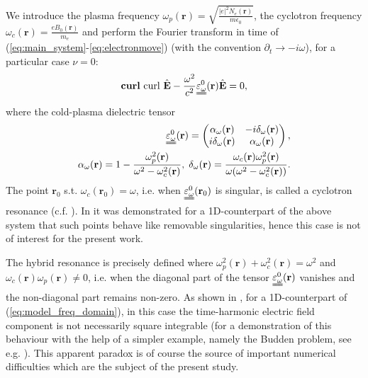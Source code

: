 We introduce the plasma frequency $\omega_p(\mathbf{r})=\sqrt{\frac{|e|^2N_e(\mathbf{r})}{m\epsilon_0}}$, 
the cyclotron frequency $\omega_c(\mathbf{r})=\frac{e B_0(\mathbf{r})}{m_e}$ and perform the Fourier transform 
in time of (\ref{eq:main_system}-\ref{eq:electronmove}) (with the convention $\partial_t\rightarrow -i\omega$), for a 
particular case $\nu=0$:
\begin{align}
\label{eq:model_freq_domain}
 \mathbf{curl}\  {\operatorname{curl}}\  \hat{\mathbf{E}}-\frac{\omega^2}{c^2}\uuline{\varepsilon_{\omega}^{0}}(\mathbf{r})\hat{\mathbf{E}}=0,
\end{align}
where the cold-plasma dielectric tensor \cite[Chapter 1-2]{Stix}
\begin{align}
\nonumber
\uuline{\varepsilon_{\omega}^{0}}(\mathbf{r})=\left(
 \begin{matrix}
  \alpha_{\omega}(\mathbf{r})& -i\delta_{\omega}(\mathbf{r})\\
  i\delta_{\omega}(\mathbf{r}) & \alpha_{\omega}(\mathbf{r})
 \end{matrix}
\right),\\
\label{eq:alpha_delta}
\alpha_{\omega}(\mathbf{r})=1-\frac{\omega_p^2(\mathbf{r})}{\omega^2-\omega_c^2(\mathbf{r})},\; \delta_{\omega}(\mathbf{r})=\frac{\omega_c(\mathbf{r})\omega_p^2(\mathbf{r})}{\omega(\omega^2-\omega_c^2(\mathbf{r}))}.
\end{align}
The point $\mathbf{r}_0$ s.t. $\omega_c(\mathbf{r}_0)=\omega$, i.e. when $\uuline{\varepsilon_{\omega}^{0}}(\mathbf{r}_0)$ is singular, is called a cyclotron resonance (c.f. \cite[Chapter 1-5]{Stix}). 
In \cite{singular_solutions} it was demonstrated for a 1D-counterpart of the above system that such points behave like removable singularities, 
hence this case is not of interest for the present work. 

 The hybrid resonance is precisely defined 
 where  $\omega_p^2(\mathbf{r})+\omega_c^2(\mathbf{r})=\omega^2$ and $\omega_c(\mathbf{r})\omega_p(\mathbf{r})\neq 0$, i.e. when the diagonal part of the tensor 
$\uuline{\varepsilon_{\omega}^{0}}(\mathbf{r})$ vanishes and the non-diagonal part remains non-zero.
As shown in \cite{Despres_2014, singular_solutions}, for a 1D-counterpart of (\ref{eq:model_freq_domain}), in this case the time-harmonic electric field component  is not necessarily square 
integrable (for a demonstration of this behaviour with the help of a simpler example, namely the Budden problem, see e.g. \cite{Despres_2014}). 
This apparent paradox is of course the source of important numerical difficulties which are the subject of the present study. 


